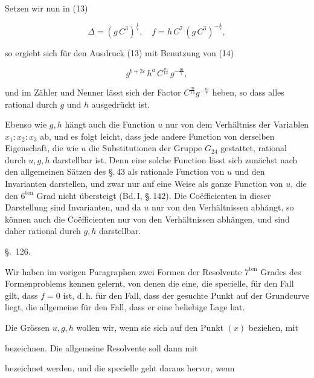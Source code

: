 Setzen wir nun in (13)

\[
\varDelta = (g\,C^3)^{\frac{1}{7}}, \quad f = h\,C^2\,(g\,C^3)^{-\frac{4}{7}},
\]

so ergiebt sich für den Ausdruck (13) mit Benutzung von (14)

\[
g^{b+2c}\,h^a\,C^{\frac{m}{14}}\,g^{-\frac{m}{7}},
\]

und im Zähler und Nenner lässt sich der Factor $C^{\frac{m}{14}}
g^{-\frac{m}{7}}$ heben, so dass alles rational durch $g$ und $h$
ausgedrückt ist.

Ebenso wie $g, h$ hängt auch die Function $u$ nur von dem Verhältniss
der Variablen $x_1 : x_2 : x_3$ ab, und es folgt leicht, dass jede
andere Function von derselben Eigenschaft, die wie $u$ die
Substitutionen der Gruppe $G_{24}$ gestattet, rational durch $u, g,
h$ darstellbar ist. Denn eine solche Function lässt sich zunächst
nach den allgemeinen Sätzen des \S.\,43 als rationale Function von
$u$ und den Invarianten darstellen, und zwar nur auf eine Weise als
ganze Function von $u$, die den $6^{\text{ten}}$ Grad nicht
übersteigt (Bd.\,I, \S.\,142). Die Co\"efficienten in dieser
Darstellung sind Invarianten, und da $u$ nur von den Verhältnissen
abhängt, so können auch die Co\"efficienten nur von den
Verhältnissen abhängen, und sind daher rational durch $g, h$
darstellbar.

\begin{center}
\S.\ 126.

\end{center}

Wir haben im vorigen Paragraphen zwei Formen der Resolvente
$7^{\text{ten}}$ Grades des Formenproblems kennen gelernt, von denen
die eine, die specielle, für den Fall gilt, dass $f = 0$ ist, d.\,h.
für den Fall, dass der gesuchte Punkt auf der Grundcurve liegt, die
allgemeine für den Fall, dass er eine beliebige Lage hat.

Die Grössen $u, g, h$ wollen wir, wenn sie sich auf den Punkt $(x)$
beziehen, mit


bezeichnen. Die allgemeine Resolvente soll dann mit


bezeichnet werden, und die specielle geht daraus hervor, wenn
